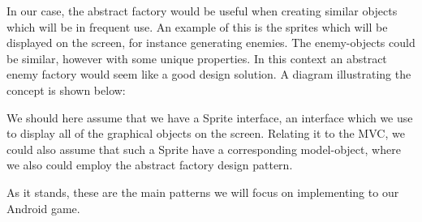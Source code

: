 In our case, the abstract factory would be useful when creating similar objects which will be in frequent use. An example of this is the sprites which will be displayed on the screen, for instance generating enemies. The enemy-objects could be similar, however with some unique properties. In this context an abstract enemy factory would seem like a good design solution. A diagram illustrating the concept is shown below:



We should here assume that we have a Sprite interface, an interface which we use to display all of the graphical objects on the screen. Relating it to the MVC, we could also assume that such a Sprite have a corresponding model-object, where we also could employ the abstract factory design pattern. 

As it stands, these are the main patterns we will focus on implementing to our Android game. 
